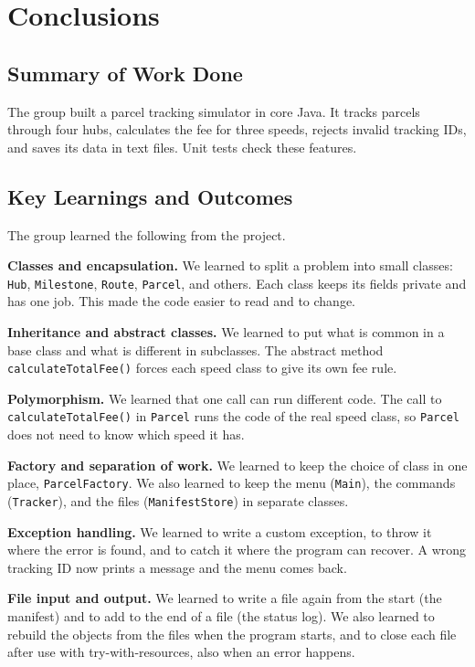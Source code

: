\chapter{Conclusions}

\section{Summary of Work Done}
The group built a parcel tracking simulator in core Java. It tracks parcels
through four hubs, calculates the fee for three speeds, rejects invalid
tracking IDs, and saves its data in text files. Unit tests check these
features.

\section{Key Learnings and Outcomes}
The group learned the following from the project.

\textbf{Classes and encapsulation.} We learned to split a problem into small
classes: \texttt{Hub}, \texttt{Milestone}, \texttt{Route}, \texttt{Parcel}, and
others. Each class keeps its fields private and has one job. This made the code
easier to read and to change.

\textbf{Inheritance and abstract classes.} We learned to put what is common in
a base class and what is different in subclasses. The abstract method
\texttt{calculateTotalFee()} forces each speed class to give its own fee rule.

\textbf{Polymorphism.} We learned that one call can run different code. The
call to \texttt{calculateTotalFee()} in \texttt{Parcel} runs the code of the
real speed class, so \texttt{Parcel} does not need to know which speed it has.

\textbf{Factory and separation of work.} We learned to keep the choice of
class in one place, \texttt{ParcelFactory}. We also learned to keep the menu
(\texttt{Main}), the commands (\texttt{Tracker}), and the files
(\texttt{ManifestStore}) in separate classes.

\textbf{Exception handling.} We learned to write a custom exception, to throw
it where the error is found, and to catch it where the program can recover.
A wrong tracking ID now prints a message and the menu comes back.

\textbf{File input and output.} We learned to write a file again from the
start (the manifest) and to add to the end of a file (the status log). We also
learned to rebuild the objects from the files when the program starts, and to
close each file after use with try-with-resources, also when an error happens.

